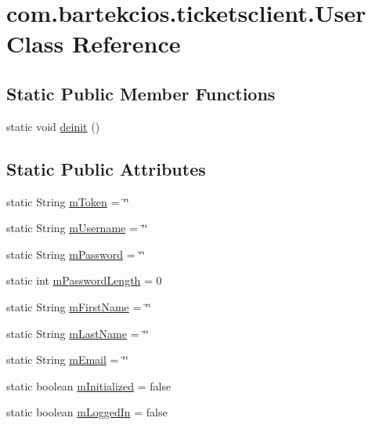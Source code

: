 \hypertarget{classcom_1_1bartekcios_1_1ticketsclient_1_1_user}{}\section{com.\+bartekcios.\+ticketsclient.\+User Class Reference}
\label{classcom_1_1bartekcios_1_1ticketsclient_1_1_user}
\subsection*{Static Public Member Functions}
\begin{DoxyCompactItemize}
\item 
static void \hyperlink{classcom_1_1bartekcios_1_1ticketsclient_1_1_user_ad78c696395812394db5d5d580ab1f8f1}{deinit} ()
\end{DoxyCompactItemize}
\subsection*{Static Public Attributes}
\begin{DoxyCompactItemize}
\item 
static String \hyperlink{classcom_1_1bartekcios_1_1ticketsclient_1_1_user_a75aae16463123f9b5cfaf6433ce87d0b}{m\+Token} = \char`\"{}\char`\"{}
\item 
static String \hyperlink{classcom_1_1bartekcios_1_1ticketsclient_1_1_user_a3bbc3729f94f81ddd202fd04f628057d}{m\+Username} = \char`\"{}\char`\"{}
\item 
static String \hyperlink{classcom_1_1bartekcios_1_1ticketsclient_1_1_user_a5100b24c376e0edd6207e85fcb0b0b3f}{m\+Password} = \char`\"{}\char`\"{}
\item 
static int \hyperlink{classcom_1_1bartekcios_1_1ticketsclient_1_1_user_aa8ad91b5ae887d110606e38d6d4f3578}{m\+Password\+Length} = 0
\item 
static String \hyperlink{classcom_1_1bartekcios_1_1ticketsclient_1_1_user_a76576395a011b4b268318a93a3de9e11}{m\+First\+Name} = \char`\"{}\char`\"{}
\item 
static String \hyperlink{classcom_1_1bartekcios_1_1ticketsclient_1_1_user_a4a7cd344e2573382d4f2cc7212b468e2}{m\+Last\+Name} = \char`\"{}\char`\"{}
\item 
static String \hyperlink{classcom_1_1bartekcios_1_1ticketsclient_1_1_user_ab83ccd7070a97bb3a47c6acccab1dd28}{m\+Email} = \char`\"{}\char`\"{}
\item 
static boolean \hyperlink{classcom_1_1bartekcios_1_1ticketsclient_1_1_user_ac956f65e8704eb4620b2c8d69df46e47}{m\+Initialized} = false
\item 
static boolean \hyperlink{classcom_1_1bartekcios_1_1ticketsclient_1_1_user_a8d6a8a2be644b51e4ae46772d240b8ba}{m\+Logged\+In} = false
\end{DoxyCompactItemize}



